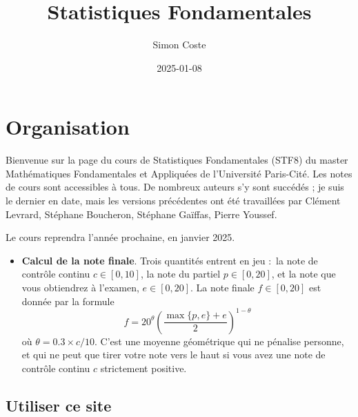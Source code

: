 \documentclass[
  10,
  letterpaper,
  DIV=11,
  numbers=noendperiod]{scrreport}
\title{Statistiques Fondamentales}
\author{Simon Coste}
\date{2025-01-08}
\providecommand{\tightlist}{%
  \setlength{\itemsep}{0pt}\setlength{\parskip}{0pt}}\usepackage{longtable,booktabs,array}
\renewcommand*\contentsname{Table des matières}
\newcommand\contentsname{Table des matières}
\theoremstyle{plain}
\theoremstyle{definition}
\theoremstyle{plain}
\theoremstyle{definition}
\theoremstyle{definition}
\theoremstyle{plain}
\theoremstyle{remark}
\begin{document}
\maketitle
\ifdefined\Shaded\renewenvironment{Shaded}{\begin{tcolorbox}[borderline west={3pt}{0pt}{shadecolor}, boxrule=0pt, frame hidden, breakable, interior hidden, enhanced, sharp corners]}{\end{tcolorbox}}\fi

\renewcommand*\contentsname{Table des matières}
{
\hypersetup{linkcolor=}
\setcounter{tocdepth}{2}
\tableofcontents
}

\hypertarget{organisation}{%
\chapter*{Organisation}\label{organisation}}


Bienvenue sur la page du cours de Statistiques Fondamentales (STF8) du
master Mathématiques Fondamentales et Appliquées de l'Université
Paris-Cité. Les notes de cours sont accessibles à tous. De nombreux
auteurs s'y sont succédés ; je suis le dernier en date, mais les
versions précédentes ont été travaillées par Clément Levrard, Stéphane
Boucheron, Stéphane Gaïffas, Pierre Youssef.

Le cours reprendra l'année prochaine, en janvier 2025.

\begin{itemize}
\tightlist
\item
  \textbf{Calcul de la note finale}. Trois quantités entrent en jeu :~la
  note de contrôle continu \(c \in [0,10]\), la note du partiel
  \(p\in [0,20]\), et la note que vous obtiendrez à l'examen,
  \(e \in [0,20]\). La note finale \(f \in [0,20]\) est donnée par la
  formule
  \[ f = 20^{\theta} \left(\frac{\max\{p,e\} + e}{2}\right)^{1 - \theta} \]
  où \(\theta = 0.3 \times c/10\). C'est une moyenne géométrique qui ne
  pénalise personne, et qui ne peut que tirer votre note vers le haut si
  vous avez une note de contrôle continu \(c\) strictement positive.
\end{itemize}

\hypertarget{utiliser-ce-site}{%
\section*{Utiliser ce site}\label{utiliser-ce-site}}
\end{document}
